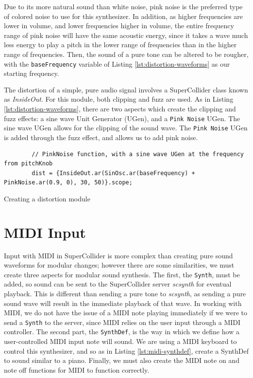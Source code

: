 Due to its more natural sound than white noise, pink noise is the preferred type of colored noise to use for this synthesizer. In addition, as higher frequencies are lower in volume, and lower frequencies higher in volume, the entire frequency range of pink noise will have the same acoustic energy, since it takes a wave much less energy to play a pitch in the lower range of frequencies than in the higher range of frequencies. Then, the sound of a pure tone can be altered to be rougher, with the \texttt{baseFrequency} variable of Listing \ref{lst:distortion-waveforms} as our starting frequency.

The distortion of a simple, pure audio signal involves a SuperCollider class known as \textit{InsideOut}. For this module, both clipping and fuzz are used. As in Listing \ref{lst:distortion-waveforms}, there are two aspects which create the clipping and fuzz effects: a sine wave Unit Generator (UGen), and a \texttt{Pink Noise} UGen. The sine wave UGen allows for the clipping of the sound wave. The \texttt{Pink Noise} UGen is added through the fuzz effect, and allows us to add pink noise.


\begin{listing}
	\begin{lstlisting}
		// PinkNoise function, with a sine wave UGen at the frequency from pitchKnob
		dist = {InsideOut.ar(SinOsc.ar(baseFrequency) + PinkNoise.ar(0.9, 0), 30, 50)}.scope;
	\end{lstlisting}
	\caption{Creating a distortion module}
	\label{lst:distortion-waveforms}
\end{listing}

\section{MIDI Input}\label{section:midi-input}

Input with MIDI in SuperCollider is more complex than creating pure sound waveforms for modular changes; however there are some similarities, we must create three aspects for modular sound synthesis. The first, the \texttt{Synth}, must be added, so sound can be sent to the SuperCollider server \textit{scsynth} for eventual playback. This is different than sending a pure tone to \textit{scsynth}, as sending a pure sound wave will result in the immediate playback of that wave. In working with MIDI, we do not have the issue of a MIDI note playing immediately if we were to send a \texttt{Synth} to the server, since MIDI relies on the user input through a MIDI controller. The second part, the \texttt{SynthDef}, is the way in which we define how a user-controlled MIDI input note will sound. We are using a MIDI keyboard to control this synthesizer, and so as in Listing \ref{lst:midi-synthdef}, create a SynthDef to sound similar to a piano. Finally, we must also create the MIDI note on and note off functions for MIDI to function correctly.

